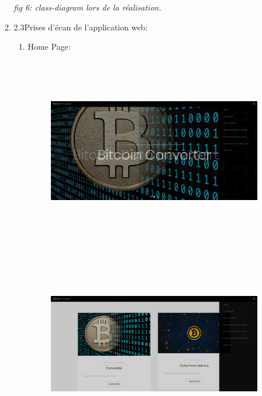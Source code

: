 \documentclass[12pt]{article}
\begin{document}
\begin{enumerate}
\begin{enumerate}
\textit{fig 6: class-diagram lors de la réalisation.}\par


\vspace{\baselineskip}
	\item 2.3\tab Prises d’écan de l’application web:\par

\begin{enumerate}
	\item Home Page:\par




\begin{figure}[H]
	\begin{Center}
		\includegraphics[width=6.69in,height=3.2in]{./media/image8.png}
	\end{Center}
\end{figure}




\par





\begin{figure}[H]
	\begin{Center}
		\includegraphics[width=6.69in,height=3.29in]{./media/image9.png}
	\end{Center}
\end{figure}




\end{enumerate}
\end{enumerate}
\end{enumerate}
\end{document}

